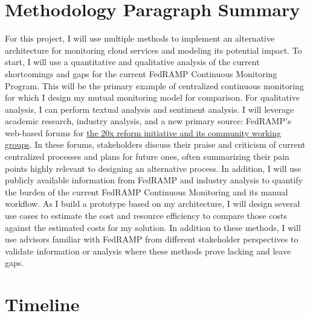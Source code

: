 \documentclass{jdf}
\begin{document}
\section*{Methodology Paragraph Summary}

For this project, I will use multiple methods to implement an alternative architecture for monitoring cloud services and modeling its potential impact. To start, I will use a quantitative and qualitative analysis of the current shortcomings and gaps for the current FedRAMP Continuous Monitoring Program. This will be the primary example of centralized continuous monitoring for which I design my mutual monitoring model for comparison. For qualitative analysis, I can perform textual analysis and sentiment analysis. I will leverage academic research, industry analysis, and a new primary source: FedRAMP's web-based forums for \hyperlink{https://www.fedramp.gov/20x/working-groups/}{the 20x reform initiative and its community working groups}. In these forums, stakeholders discuss their praise and criticism of current centralized processes and plans for future ones, often summarizing their pain points highly relevant to designing an alternative process. In addition, I will use publicly available information from FedRAMP and industry analysis to quantify the burden of the current FedRAMP Continuous Monitoring and its manual workflow. As I build a prototype based on my architecture, I will design several use cases to estimate the cost and resource efficiency to compare those costs against the estimated costs for my solution. In addition to these methods, I will use advisors familiar with FedRAMP from different stakeholder perspectives to validate information or analysis where these methods prove lacking and leave gaps.

\section*{Timeline}
\end{document}
